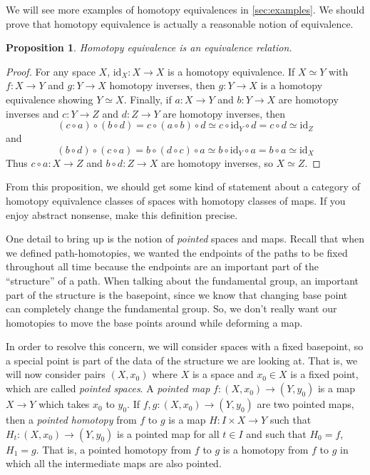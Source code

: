 \documentclass{article}
\newtheorem{prop}[thm]{Proposition}
\theoremstyle{definition}
\theoremstyle{remark}
\numberwithin{figure}{section}
\begin{document}
We will see more examples of homotopy equivalences in \cref{sec:examples}. We should prove that homotopy equivalence is actually a reasonable notion of equivalence.

\begin{prop}
	Homotopy equivalence is an equivalence relation.
\end{prop}

\begin{proof}
	For any space $X$, $\mathrm{id}_X : X \to X$ is a homotopy equivalence. If $X \simeq Y$ with $f : X \to Y$ and $g : Y \to X$ homotopy inverses, then $g : Y \to X$ is a homotopy equivalence showing $Y \simeq X$. Finally, if $a : X \to Y$ and $b : Y \to X$ are homotopy inverses and $c : Y \to Z$ and $d : Z \to Y$ are homotopy inverses, then
	\[
	(c \circ a) \circ (b \circ d) = c \circ (a \circ b) \circ d \simeq c \circ \mathrm{id}_Y \circ d = c \circ d \simeq \mathrm{id}_Z
	\]
	and
	\[
	(b \circ d) \circ (c \circ a) = b \circ (d \circ c) \circ a \simeq b \circ \mathrm{id}_Y \circ a = b \circ a \simeq \mathrm{id}_X
	\]
	Thus $c \circ a : X \to Z$ and $b \circ d : Z \to X$ are homotopy inverses, so $X \simeq Z$.
\end{proof}

From this proposition, we should get some kind of statement about a category of homotopy equivalence classes of spaces with homotopy classes of maps. If you enjoy abstract nonsense, make this definition precise.
\bigskip

One detail to bring up is the notion of \emph{pointed} spaces and maps. Recall that when we defined path-homotopies, we wanted the endpoints of the paths to be fixed throughout all time because the endpoints are an important part of the ``structure'' of a path. When talking about the fundamental group, an important part of the structure is the basepoint, since we know that changing base point can completely change the fundamental group. So, we don't really want our homotopies to move the base points around while deforming a map.

In order to resolve this concern, we will consider spaces with a fixed basepoint, so a special point is part of the data of the structure we are looking at. That is, we will now consider pairs $(X, x_0)$ where $X$ is a space and $x_0 \in X$ is a fixed point, which are called \emph{pointed spaces}. A \emph{pointed map} $f : (X, x_0) \to (Y, y_0)$ is a map $X \to Y$ which takes $x_0$ to $y_0$. If $f, g : (X, x_0) \to (Y, y_0)$ are two pointed maps, then a \emph{pointed homotopy} from $f$ to $g$ is a map $H : I \times X \to Y$ such that $H_t : (X, x_0) \to (Y, y_0)$ is a pointed map for all $t \in I$ and such that $H_0 = f$, $H_1 = g$. That is, a pointed homotopy from $f$ to $g$ is a homotopy from $f$ to $g$ in which all the intermediate maps are also pointed.
\end{document}
